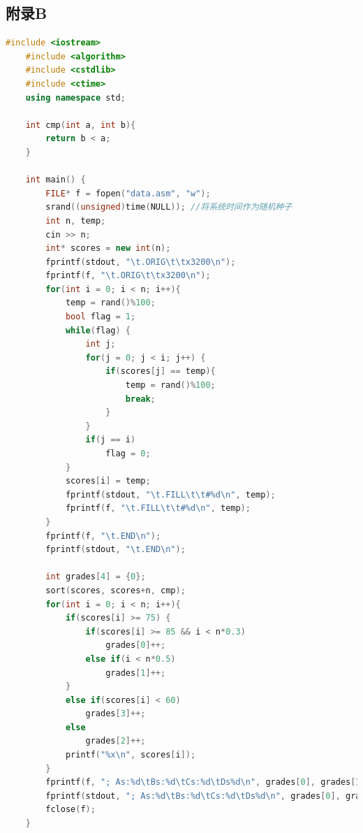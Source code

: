 \documentclass[UTF8]{article}
\begin{document}
	\subsection{附录B}
	\begin{lstlisting}[language=C++]
	#include <iostream>
	#include <algorithm>
	#include <cstdlib>
	#include <ctime>
	using namespace std;
	
	int cmp(int a, int b){
		return b < a;
	}
	
	int main() {
		FILE* f = fopen("data.asm", "w");
		srand((unsigned)time(NULL)); //将系统时间作为随机种子 
		int n, temp;
		cin >> n;
		int* scores = new int(n);
		fprintf(stdout, "\t.ORIG\t\tx3200\n");
		fprintf(f, "\t.ORIG\t\tx3200\n");
		for(int i = 0; i < n; i++){
			temp = rand()%100;
			bool flag = 1;
			while(flag) {
				int j;
				for(j = 0; j < i; j++) {
					if(scores[j] == temp){
						temp = rand()%100;
						break;
					}
				}
				if(j == i)
					flag = 0;
			}
			scores[i] = temp;
			fprintf(stdout, "\t.FILL\t\t#%d\n", temp);
			fprintf(f, "\t.FILL\t\t#%d\n", temp);
		}
		fprintf(f, "\t.END\n");
		fprintf(stdout, "\t.END\n");
		
		int grades[4] = {0};
		sort(scores, scores+n, cmp);
		for(int i = 0; i < n; i++){
			if(scores[i] >= 75) {
				if(scores[i] >= 85 && i < n*0.3)
					grades[0]++;
				else if(i < n*0.5)
					grades[1]++;
			}
			else if(scores[i] < 60)
				grades[3]++;
			else
				grades[2]++;
			printf("%x\n", scores[i]);
		}
		fprintf(f, "; As:%d\tBs:%d\tCs:%d\tDs%d\n", grades[0], grades[1], grades[2], grades[3]);
		fprintf(stdout, "; As:%d\tBs:%d\tCs:%d\tDs%d\n", grades[0], grades[1], grades[2], grades[3]);
		fclose(f);
	}
	\end{lstlisting}
\end{document}
